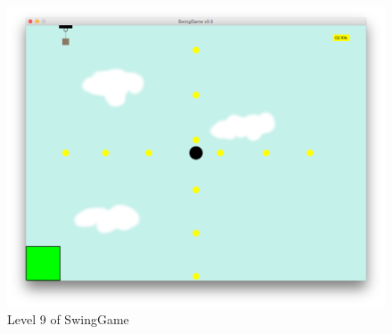 \documentclass[]{report}
\begin{document}
\begin{appendices}
\begin{figure}[H]
			\includegraphics[scale=0.25]{level9}
			\caption{Level 9 of SwingGame}
			\label{level9}
		\end{figure}
		
	\end{appendices}
	



\end{document}
